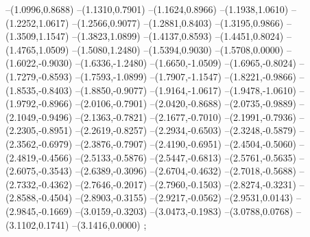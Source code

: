 {--(1.0996,0.8688)
--(1.1310,0.7901)
--(1.1624,0.8966)
--(1.1938,1.0610)
--(1.2252,1.0617)
--(1.2566,0.9077)
--(1.2881,0.8403)
--(1.3195,0.9866)
--(1.3509,1.1547)
--(1.3823,1.0899)
--(1.4137,0.8593)
--(1.4451,0.8024)
--(1.4765,1.0509)
--(1.5080,1.2480)
--(1.5394,0.9030)
--(1.5708,0.0000)
--(1.6022,-0.9030)
--(1.6336,-1.2480)
--(1.6650,-1.0509)
--(1.6965,-0.8024)
--(1.7279,-0.8593)
--(1.7593,-1.0899)
--(1.7907,-1.1547)
--(1.8221,-0.9866)
--(1.8535,-0.8403)
--(1.8850,-0.9077)
--(1.9164,-1.0617)
--(1.9478,-1.0610)
--(1.9792,-0.8966)
--(2.0106,-0.7901)
--(2.0420,-0.8688)
--(2.0735,-0.9889)
--(2.1049,-0.9496)
--(2.1363,-0.7821)
--(2.1677,-0.7010)
--(2.1991,-0.7936)
--(2.2305,-0.8951)
--(2.2619,-0.8257)
--(2.2934,-0.6503)
--(2.3248,-0.5879)
--(2.3562,-0.6979)
--(2.3876,-0.7907)
--(2.4190,-0.6951)
--(2.4504,-0.5060)
--(2.4819,-0.4566)
--(2.5133,-0.5876)
--(2.5447,-0.6813)
--(2.5761,-0.5635)
--(2.6075,-0.3543)
--(2.6389,-0.3096)
--(2.6704,-0.4632)
--(2.7018,-0.5688)
--(2.7332,-0.4362)
--(2.7646,-0.2017)
--(2.7960,-0.1503)
--(2.8274,-0.3231)
--(2.8588,-0.4504)
--(2.8903,-0.3155)
--(2.9217,-0.0562)
--(2.9531,0.0143)
--(2.9845,-0.1669)
--(3.0159,-0.3203)
--(3.0473,-0.1983)
--(3.0788,0.0768)
--(3.1102,0.1741)
--(3.1416,0.0000)
;}
